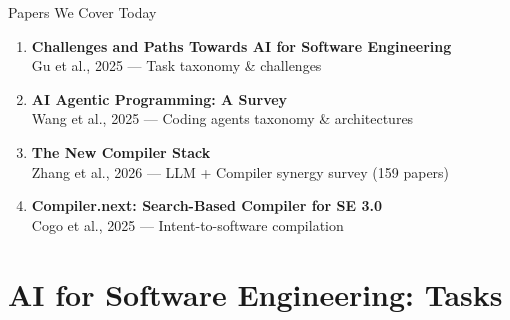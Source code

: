 \documentclass[aspectratio=169,10pt]{beamer}
\begin{document}
\begin{frame}{Papers We Cover Today}
    \begin{enumerate}
        \item \textbf{Challenges and Paths Towards AI for Software Engineering} \\
        {\small Gu et al., 2025 — Task taxonomy \& challenges}
        
        \item \textbf{AI Agentic Programming: A Survey} \\
        {\small Wang et al., 2025 — Coding agents taxonomy \& architectures}
        
        \item \textbf{The New Compiler Stack} \\
        {\small Zhang et al., 2026 — LLM + Compiler synergy survey (159 papers)}
        
        \item \textbf{Compiler.next: Search-Based Compiler for SE 3.0} \\
        {\small Cogo et al., 2025 — Intent-to-software compilation}
    \end{enumerate}
\end{frame}

\section{AI for Software Engineering: Tasks}
\end{document}

